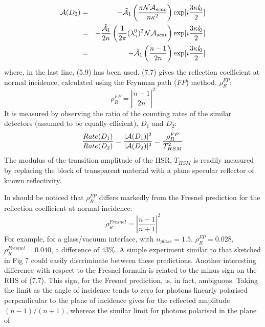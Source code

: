 {   \begin{eqnarray}
  {\cal A}(D_2) & = & - \tilde{ {\cal A}}_1 \left(\frac{\pi {\cal N} {\cal A}_{scat}}{n \kappa^2}\right)
    \exp[i\frac{3 \kappa {\it l}_0}{2}]  \nonumber \\
         & = & -\frac{\tilde{ {\cal A}}_1}{2n}\left(\frac{1}{2\pi} (\lambda_{\gamma}^0)^2
      {\cal N} {\cal A}_{scat} \right) \exp[i\frac{3 \kappa {\it l}_0}{2}] \nonumber \\
      & = & -\tilde{{\cal A}}_1 \left(\frac{n-1}{2n}\right) \exp[i\frac{3 \kappa {\it l}_0}{2}]       
     \end{eqnarray}
   where, in the last line, (5.9) has been used. (7.7) gives the reflection coefficient at normal
    incidence, calculated using the Feynman path ($FP$) method, $\rho_R^{FP}$:
   \begin{equation}
 \rho_R^{FP} = \left|\frac{n-1}{2n}\right|^2
    \end{equation}
    It is measured by observing the ratio of the counting rates of the similar detectors (assumed
    to be equally efficient), $D_1$ and $D_2$:
    \begin{equation}
     \frac{Rate(D_1)}{Rate(D_2)} = \frac{|{\cal A}(D_1)|^2}{|{\cal A}(D_2)|^2} =\frac{\rho_R^{FP}}{T_{HSM}^2}     
\end{equation}
The modulus of the transition amplitude of the HSR, $T_{HSM}$  is readily measured by replacing the block of
 transparent material with  a plane specular reflector of known reflectivity.
  \par In should be noticed that $\rho_R^{FP}$ differs markedly from the Fresnel prediction
  for the reflection coefficient at normal incidence:
    \begin{equation}
  \rho_R^{Fresnel} = \left|\frac{n-1}{n+1}\right|^2
    \end{equation}
 For example, for a glass/vacuum interface, with $n_{
 glass} = 1.5$, $\rho_R^{FP} = 0.028$, 
   $\rho_R^{Fresnel} = 0.040$, a difference of 43$\%$. A simple experiment similar to that sketched
   in Fig 7 could easily discriminate between these predictions. Another interesting difference
   with respect to the Fresnel formula is related to the minus sign on the RHS of (7.7). This sign,
     for the Fresnel prediction, is, in fact, ambiguous. Taking the limit as the angle of incidence 
     tends to zero for photons linearly polarised perpendicular to the plane of incidence gives for the reflected
     amplitude $(n-1)/(n+1)$, whereas the similar limit for photons polarised in the plane of
}
